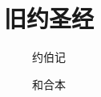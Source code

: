\documentclass[12pt,oneside]{book}
\begin{document}
\title{旧约圣经}
\subtitle{约伯记}
\author{和合本}

\makemytitle
\end{document}

